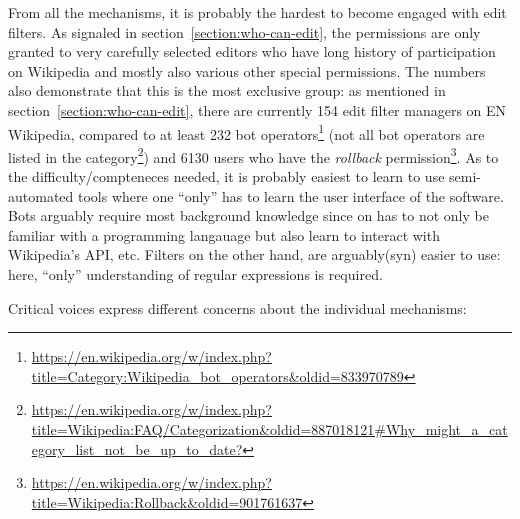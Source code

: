 From all the mechanisms, it is probably the hardest to become engaged with edit filters.
As signaled in section~\ref{section:who-can-edit}, the permissions are only granted to very carefully selected editors who have long history of participation on Wikipedia and mostly also various other special permissions.
The numbers also demonstrate that this is the most exclusive group:
as mentioned in section~\ref{section:who-can-edit}, there are currently 154 edit filter managers on EN Wikipedia,
compared to at least 232 bot operators\footnote{\url{https://en.wikipedia.org/w/index.php?title=Category:Wikipedia_bot_operators&oldid=833970789}} (not all bot operators are listed in the category\footnote{\url{https://en.wikipedia.org/w/index.php?title=Wikipedia:FAQ/Categorization&oldid=887018121#Why_might_a_category_list_not_be_up_to_date?}})
and 6130 users who have the \emph{rollback} permission\footnote{\url{https://en.wikipedia.org/w/index.php?title=Wikipedia:Rollback&oldid=901761637}}.
As to the difficulty/compteneces needed, it is probably easiest to learn to use semi-automated tools where one ``only'' has to learn the user interface of the software.
Bots arguably require most background knowledge since on has to not only be familiar with a programming langauage but also learn to interact with Wikipedia's API, etc.
Filters on the other hand, are arguably(syn) easier to use: here, ``only'' understanding of regular expressions is required.

Critical voices express different concerns about the individual mechanisms:

